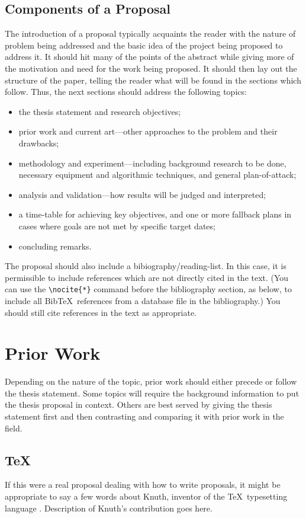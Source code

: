 \documentclass[11pt]{article}
\begin{document}
\subsection{Components of a Proposal}
The introduction of a proposal typically acquaints the reader with
the nature of problem being addressed and the basic idea of the
project being proposed to address it.  It should hit many of the points
of the abstract while giving more of the motivation and need for the
work being proposed.  It should then lay out the structure of the
paper, telling the reader what will be found in the sections which
follow.  Thus, the next sections should address the following topics:
\begin{itemize}
\item
the thesis statement and research objectives;
\item
prior work and current art---other approaches to the problem and
their drawbacks;
\item
methodology and experiment---including background research
to be done, necessary equipment and algorithmic techniques, and general
plan-of-attack;
\item
analysis and validation---how results will be judged and interpreted;
\item
a time-table for achieving key objectives, and one or more fallback plans
in cases where goals are not met by specific target dates;
\item concluding remarks.
\end{itemize}
The proposal should also include a bibiography/reading-list.  In
this case, it is permissible to include references which are not directly
cited in the text.  (You can use the \verb+\nocite{*}+ command before the
bibliography section, as below, to include all Bib\TeX\ references
from a database file in the bibliography.)  You should still cite
references in the text as appropriate.

\section{Prior Work}

Depending on the nature of the topic, prior work should either precede
or follow the thesis statement.  Some topics will require the
background information to put the thesis proposal in context.  Others
are best served by giving the thesis statement first and then contrasting
and comparing it with prior work in the field.

\subsection{\TeX}
If this were a real proposal dealing with how to write proposals,
it might be appropriate to say a few words
about Knuth, inventor of the \TeX\ typesetting language \cite{knuth:84}.
Description of Knuth's contribution goes here.
\end{document}
